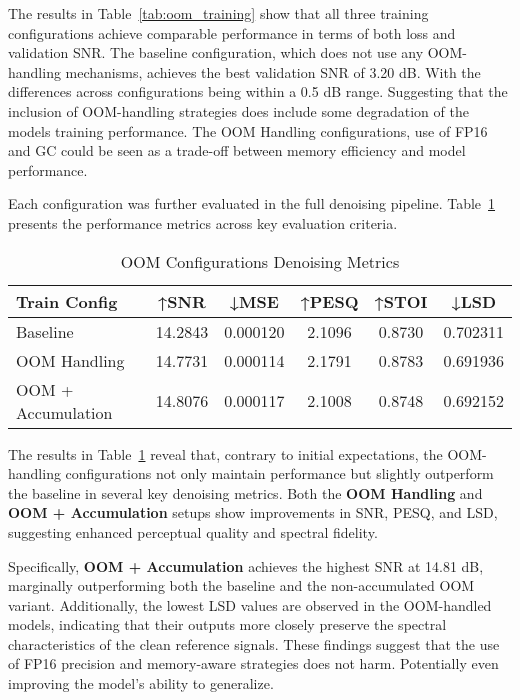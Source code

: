 The results in Table~\ref{tab:oom_training} show that all three training configurations achieve comparable performance in terms of both loss and validation SNR. The baseline configuration, which does not use any OOM-handling mechanisms, achieves the best validation SNR of 3.20 dB. With the differences across configurations being within a 0.5 dB range. Suggesting that the inclusion of OOM-handling strategies does include some degradation of the models training performance. The OOM Handling configurations, use of FP16 and GC could be seen as a trade-off between memory efficiency and model performance. 

Each configuration was further evaluated in the full denoising pipeline. Table~\ref{tab:oom_metrics} presents the performance metrics across key evaluation criteria.

\vspace{1em}
\begin{table}[H]
\centering
\caption{OOM Configurations Denoising Metrics}
\label{tab:oom_metrics}
\begin{tabular}{|l|c|c|c|c|c|}
\hline
\textbf{Train Config} & \textbf{↑SNR} & \textbf{↓MSE} & \textbf{↑PESQ} & \textbf{↑STOI} & \textbf{↓LSD} \\
\hline
Baseline               &  14.2843 & 0.000120 & 2.1096 & 0.8730 & 0.702311 \\
OOM Handling           & 14.7731 & 0.000114 & 2.1791 & 0.8783 & 0.691936 \\
OOM + Accumulation     & 14.8076 & 0.000117 & 2.1008 & 0.8748 & 0.692152 \\
\hline
\end{tabular}
\end{table}

The results in Table~\ref{tab:oom_metrics} reveal that, contrary to initial expectations, the OOM-handling configurations not only maintain performance but slightly outperform the baseline in several key denoising metrics. Both the \textbf{OOM Handling} and \textbf{OOM + Accumulation} setups show improvements in SNR, PESQ, and LSD, suggesting enhanced perceptual quality and spectral fidelity.

Specifically, \textbf{OOM + Accumulation} achieves the highest SNR at 14.81 dB, marginally outperforming both the baseline and the non-accumulated OOM variant. Additionally, the lowest LSD values are observed in the OOM-handled models, indicating that their outputs more closely preserve the spectral characteristics of the clean reference signals. These findings suggest that the use of FP16 precision and memory-aware strategies does not harm. Potentially even improving the model's ability to generalize. 

